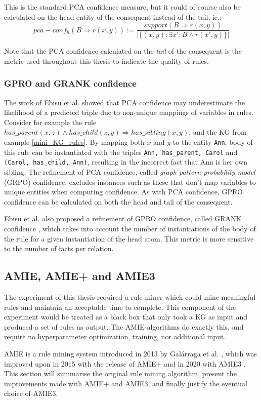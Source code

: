 This is the standard PCA confidence measure, but it could of course also be calculated on the head entity of the consequent instead of the tail, ie.: 
\[pca-conf_h(B\Rightarrow r(x, y)) := \frac{support(B\Rightarrow r(x, y))}{|\{(x, y):\exists x' : B \wedge r(x', y)\}|}\]

Note that the PCA confidence calculated on the \textit{tail} of the consequent is the metric used throughout this thesis to indicate the quality of rules.

\subsubsection{GPRO and GRANK confidence}
The work of Ebisu et al. \cite{gpro} showed that PCA confidence may underestimate the likelihood of a predicted triple due to non-unique mappings of variables in rules. Consider for example the rule $has\_parent(x, z) \wedge has\_child(z, y) \Rightarrow has\_sibling(x, y)$, and the KG from example \ref{mini_KG_rules}. By mapping both $x$ and $y$ to the entity \texttt{Ann}, body of this rule can be instantiated with the triples \texttt{Ann, has\_parent, Carol} and \texttt{(Carol, has\_child, Ann)}, resulting in the incorrect fact that Ann is her own sibling. The refinement of PCA confidence, called \textit{graph pattern probability model} (GRPO) confidence, excludes instances such as these that don't map variables to unique entities when computing confidence. As with PCA confidence, GPRO confidence can be calculated on both the head and tail of the consequent.

Ebisu et al. also proposed a refinement of GPRO confidence, called GRANK confidence \cite{gpro}, which takes into account the number of instantiations of the body of the rule for a given instantiation of the head atom. This metric is more sensitive to the number of facts per relation.


\subsection{AMIE, AMIE+ and AMIE3}
\label{the_amies}
The experiment of this thesis required a rule miner which could mine meaningful rules and maintain an acceptable time to complete. This component of the experiment would be treated as a black box that only took a KG as input and produced a set of rules as output. The AMIE-algorithms do exactly this, and require no hyperparameter optimization, training, nor additional input.

AMIE is a rule mining system introduced in 2013 by Galárraga et al. \cite{amie}, which was improved upon in 2015 with the release of AMIE+ \cite{amie_plus} and in 2020 with AMIE3 \cite{amie3}. This section will summarise the original rule mining algorithm, present the improvements made with AMIE+ and AMIE3, and finally justify the eventual choice of AMIE3.

